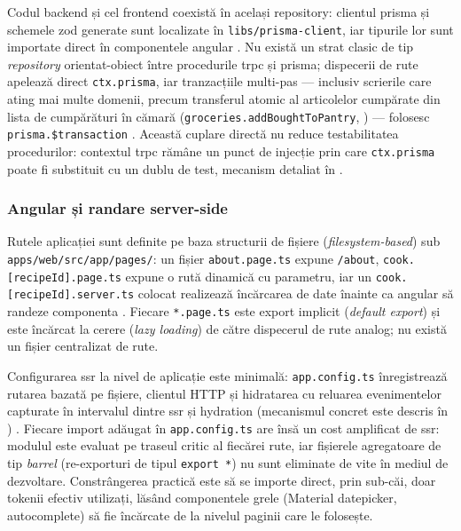 Codul backend și cel frontend coexistă în același repository: clientul \gls{prisma} și schemele \gls{zod} generate sunt localizate în \texttt{libs/prisma-client}, iar tipurile lor sunt importate direct în componentele \gls{angular} \cite{prisma_zod_generator}. Nu există un strat clasic de tip \textit{repository} orientat-obiect între procedurile \gls{trpc} și \gls{prisma}; dispecerii de rute apelează direct \texttt{ctx.prisma}, iar tranzacțiile multi-pas --- inclusiv scrierile care ating mai multe domenii, precum transferul atomic al articolelor cumpărate din lista de cumpărături în cămară (\texttt{groceries.addBoughtToPantry}, ) --- folosesc \texttt{prisma.\$transaction} \cite{trpc,prisma_transactions}. Această cuplare directă nu reduce testabilitatea procedurilor: contextul \gls{trpc} rămâne un punct de injecție prin care \texttt{ctx.prisma} poate fi substituit cu un dublu de test, mecanism detaliat în .

\subsubsection{Angular și randare server-side}\label{subsec:angular-ssr-implementare}

Rutele aplicației sunt definite pe baza structurii de fișiere (\textit{filesystem-based}) sub \texttt{apps/\allowbreak web/\allowbreak src/\allowbreak app/\allowbreak pages/}: un fișier \texttt{about.page.ts} expune \texttt{/about}, \texttt{cook.[recipeId].page.ts} expune o rută dinamică cu parametru, iar un \texttt{cook.[recipeId].server.ts} colocat realizează încărcarea de date înainte ca \gls{angular} să randeze componenta \cite{analog,analog_routing}. Fiecare \texttt{*.page.ts} este export implicit (\textit{default export}) și este încărcat la cerere (\textit{lazy loading}) de către dispecerul de rute \gls{analog}; nu există un fișier centralizat de rute.

Configurarea \acrshort{ssr} la nivel de aplicație este minimală: \texttt{app.config.ts} înregistrează rutarea bazată pe fișiere, clientul HTTP și hidratarea cu reluarea evenimentelor capturate în intervalul dintre \acrshort{ssr} și \gls{hydration} (mecanismul concret este descris în ) \cite{analog}. Fiecare import adăugat în \texttt{app.config.ts} are însă un cost amplificat de \acrshort{ssr}: modulul este evaluat pe traseul critic al fiecărei rute, iar fișierele agregatoare de tip \textit{barrel} (re-exporturi de tipul \texttt{export *}) nu sunt eliminate de \gls{vite} în mediul de dezvoltare. Constrângerea practică este să se importe direct, prin sub-căi, doar tokenii efectiv utilizați, lăsând componentele grele (Material datepicker, autocomplete) să fie încărcate de la nivelul paginii care le folosește.

